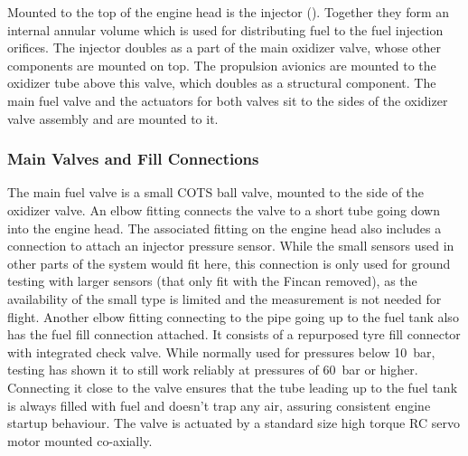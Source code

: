 Mounted to the top of the engine head is the injector (). Together they form an internal annular volume which is used for distributing fuel to the fuel injection orifices. The injector doubles as a part of the main oxidizer valve, whose other components are mounted on top. The propulsion avionics are mounted to the oxidizer tube above this valve, which doubles as a structural component. The main fuel valve and the actuators for both valves sit to the sides of the oxidizer valve assembly and are mounted to it.

\subsubsection{Main Valves and Fill Connections}\label{sec:sysarch_prop_mainvalves}

The main fuel valve is a small COTS ball valve, mounted to the side of the oxidizer valve.
An elbow fitting connects the valve to a short tube going down into the engine head. The associated fitting on the engine head also includes a connection to attach an injector pressure sensor. While the small sensors used in other parts of the system would fit here, this connection is only used for ground testing with larger sensors (that only fit with the Fincan removed), as the availability of the small type is limited and the measurement is not needed for flight.
Another elbow fitting connecting to the pipe going up to the fuel tank also has the fuel fill connection attached. It consists of a repurposed tyre fill connector with integrated check valve. While normally used for pressures below \SI{10}{\bar}, testing has shown it to still work reliably at pressures of \SI{60}{\bar} or higher. Connecting it close to the valve ensures that the tube leading up to the fuel tank is always filled with fuel and doesn't trap any air, assuring consistent engine startup behaviour.
The valve is actuated by a standard size high torque RC servo motor mounted co-axially.

